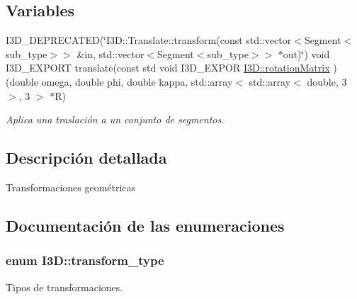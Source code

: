\subsection*{Variables}
\begin{DoxyCompactItemize}
\item 
I3\+D\+\_\+\+D\+E\+P\+R\+E\+C\+A\+T\+ED(\char`\"{}I3\+D\+::\+Translate\+::transform(const std\+::vector$<$Segment$<$sub\+\_\+type$>$$>$ \&in, std\+::vector$<$Segment$<$sub\+\_\+type$>$$>$ $\ast$out)\char`\"{}) void I3\+D\+\_\+\+E\+X\+P\+O\+RT translate(const std void I3\+D\+\_\+\+E\+X\+P\+OR \hyperlink{group__trf_group_ga9fd1816708824e1c55f816cb7663ffc5}{I3\+D\+::rotation\+Matrix} )(double omega, double phi, double kappa, std\+::array$<$ std\+::array$<$ double, 3 $>$, 3 $>$ $\ast$R)
\begin{DoxyCompactList}\small\item\em Aplica una traslación a un conjunto de segmentos. \end{DoxyCompactList}\end{DoxyCompactItemize}


\subsection{Descripción detallada}
Transformaciones geométricas 

\subsection{Documentación de las enumeraciones}
\subsubsection[{\texorpdfstring{transform\+\_\+type}{transform_type}}]{\setlength{\rightskip}{0pt plus 5cm}enum {\bf I3\+D\+::transform\+\_\+type}\hspace{0.3cm}{\ttfamily [strong]}}\hypertarget{group__trf_group_ga175e1580b1ecbc0710ad48060d56c2a3}{}\label{group__trf_group_ga175e1580b1ecbc0710ad48060d56c2a3}


Tipos de transformaciones. 

